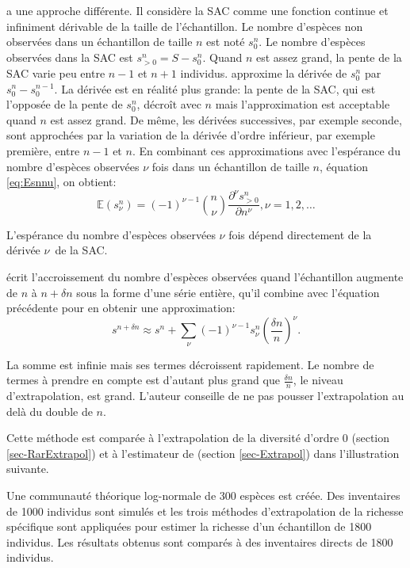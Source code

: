 \documentclass[
  11pt,
  french,
  a4paper,
  extrafontsizes,onecolumn,openright
  ]{memoir}
\begin{document}
\textcite{Beguinot2015} a une approche différente.
Il considère la SAC comme une fonction continue et infiniment dérivable de la taille de l'échantillon.
Le nombre d'espèces non observées dans un échantillon de taille \(n\) est noté \(s^{n}_{0}\).
Le nombre d'espèces observées dans la SAC est \(s^{n}_{>0} = S - s^{n}_{0}\).
Quand \(n\) est assez grand, la pente de la SAC varie peu entre \(n-1\) et \(n+1\) individus.
\textcite{Beguinot2014} approxime la dérivée de \(s^{n}_{0}\) par \(s^{n}_{0}-s^{n-1}_{0}\).
La dérivée est en réalité plus grande: la pente de la SAC, qui est l'opposée de la pente de \(s^{n}_{0}\), décroît avec \(n\) mais l'approximation est acceptable quand \(n\) est assez grand.
De même, les dérivées successives, par exemple seconde, sont approchées par la variation de la dérivée d'ordre inférieur, par exemple première, entre \(n-1\) et \(n\).
En combinant ces approximations avec l'espérance du nombre d'espèces observées \(\nu\) fois dans un échantillon de taille \(n\), équation \eqref{eq:Esnnu}, on obtient:
\begin{equation}
  \label{eq:Beguinot2014}
  {\mathbb E}\left( s^{n}_{\nu} \right) 
  = \left(-1 \right)^{\nu-1} \binom{n}{\nu} \frac{\partial^\nu s^{n}_{>0}}{\partial n^\nu}, \nu=1,2,\dots
\end{equation}

L'espérance du nombre d'espèces observées \(\nu\) fois dépend directement de la dérivée \(\nu\)\ieme~de la SAC.

\textcite{Beguinot2015} écrit l'accroissement du nombre d'espèces observées quand l'échantillon augmente de \(n\) à \(n +\delta n\) sous la forme d'une série entière, qu'il combine avec l'équation précédente pour en obtenir une approximation:
\begin{equation}
  s^{n +\delta n}
  \approx s^{n} + \sum_\nu {\left(-1 \right)^{\nu-1} s^{n}_{\nu} \left(\frac{\delta n}{n}\right)^{\nu}}.
\end{equation}

La somme est infinie mais ses termes décroissent rapidement.
Le nombre de termes à prendre en compte est d'autant plus grand que \(\frac{\delta n}{n}\), le niveau d'extrapolation, est grand.
L'auteur conseille de ne pas pousser l'extrapolation au delà du double de \(n\).

Cette méthode est comparée à l'extrapolation de la diversité d'ordre 0 (section \ref{sec-RarExtrapol}) et à l'estimateur de \textcite{Shen2003} (section \ref{sec-Extrapol}) dans l'illustration suivante.

Une communauté théorique log-normale de 300 espèces est créée.
Des inventaires de 1000 individus sont simulés et les trois méthodes d'extrapolation de la richesse spécifique sont appliquées pour estimer la richesse d'un échantillon de 1800 individus.
Les résultats obtenus sont comparés à des inventaires directs de 1800 individus.
\end{document}
